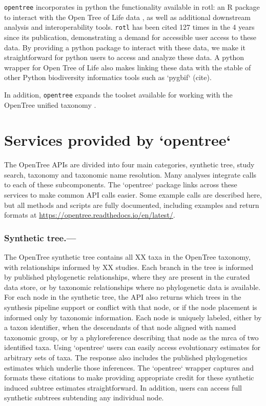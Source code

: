 \documentclass[oupdraft]{sysbio_sse}
\begin{document}
\texttt{opentree} incorporates in python the functionality available in rotl: an {R} package to interact with the Open Tree of Life data \citep{michonneau_rotl:_2016}, as well as additional downstream analysis and interoperability tools.
\texttt{rotl}  has been cited 127 times in the 4 years since its publication, demonstrating a demand for accessible user access to these data.
By providing a python package to interact with these data, we make it straightforward for python users to access and analyze these data.
A python wrapper for Open Tree of Life also makes linking these data with the stable of other Python biodiversity informatics tools such as  `pygbif` (cite).

In addition, \texttt{opentree} expands the toolset available for working with the OpenTree unified taxonomy \citep{rees_automated_2017}.


\bigskip
\section{Services provided by `opentree`}
\label{sec3}


The OpenTree APIs are divided into four main categories, synthetic tree, study search, taxonomy and taxonomic name resolution.
Many analyses integrate calls to each of these subcomponents. 
The `opentree` package links across these services to make common API calls easier.
Some example calls are described here, but all methods and scripts are fully documented, including examples and return formats at \url{https://opentree.readthedocs.io/en/latest/}.

\subsubsection{Synthetic tree.---} The OpenTree synthetic tree contains all XX taxa in the OpenTree taxonomy, with relationships informed by XX studies.
Each branch in the tree is informed by published phylogenetic relationships, where they are present in the curated data store, or by taxonomic relationships where no phylogenetic data is available.
For each node in the synthetic tree, the API also returns which trees in the synthesis pipeline support or conflict with that node, or if the node placement is informed only by taxonomic information.
Each node is uniquely labeled, either by a taxon identifier, when the descendants of that node aligned with named taxonomic group, or by a phyloreference describing that node as the mrca of two identified taxa.
Using `opentree` users can easily access evolutionary estimates for arbitrary sets of taxa. The response also includes the published phylogenetics estimates which underlie those inferences. The `opentree` wrapper captures and formats these citations to make providing appropriate credit for these synthetic induced subtree estimates straightforward.
In addition, users can access full synthetic subtrees subtending any individual node.
\end{document}
